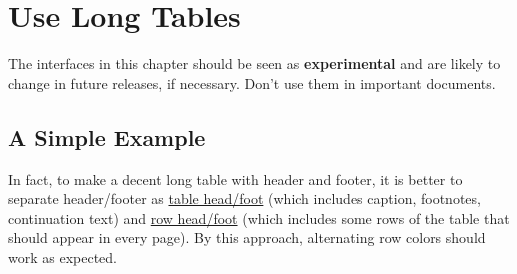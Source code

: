 \documentclass[oneside]{book}
\newcommand{\mywarning}[1]{%
  \begin{tcolorbox}
  The interfaces in this #1 should be seen as
  \textcolor{red3}{\bfseries experimental}
  and are likely to change in future releases, if necessary.
  Don’t use them in important documents.
  \end{tcolorbox}
}
\begin{document}
\chapter{Use Long Tables}
\label{chap:long}

\mywarning{chapter}

\section{A Simple Example}

In fact, to make a decent long table with header and footer, it is better to separate header/footer as
\underline{table head/foot} (which includes caption, footnotes, continuation text)
and \underline{row head/foot} (which includes some rows of the table that should appear in every page).
By this approach, alternating row colors should work as expected.
\end{document}
